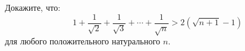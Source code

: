 Докажите, что:
$$
    1 + \frac{1}{\sqrt{2}} + \frac{1}{\sqrt{3}} + \cdots + \frac{1}{\sqrt{n}} > 2(\sqrt{n + 1} - 1)
$$
для любого положительного натурального $n$.